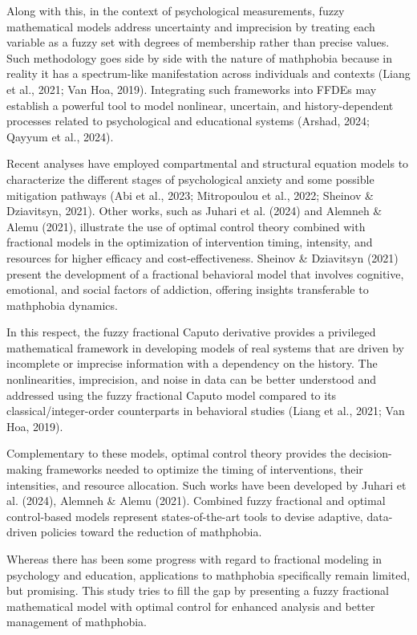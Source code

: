 \documentclass[10pt]{NSP1}
\begin{document}
Along with this, in the context of psychological measurements, fuzzy mathematical models address uncertainty and imprecision by treating each variable as a fuzzy set with degrees of membership rather than precise values. Such methodology goes side by side with the nature of mathphobia because in reality it has a spectrum-like manifestation across individuals and contexts (Liang et al., 2021; Van Hoa, 2019). Integrating such frameworks into FFDEs may establish a powerful tool to model nonlinear, uncertain, and history-dependent processes related to psychological and educational systems (Arshad, 2024; Qayyum et al., 2024).

Recent analyses have employed compartmental and structural equation models to characterize the different stages of psychological anxiety and some possible mitigation pathways (Abi et al., 2023; Mitropoulou et al., 2022; Sheinov \& Dziavitsyn, 2021). Other works, such as Juhari et al. (2024) and Alemneh \& Alemu (2021), illustrate the use of optimal control theory combined with fractional models in the optimization of intervention timing, intensity, and resources for higher efficacy and cost-effectiveness. Sheinov \& Dziavitsyn (2021) present the development of a fractional behavioral model that involves cognitive, emotional, and social factors of addiction, offering insights transferable to mathphobia dynamics.

In this respect, the fuzzy fractional Caputo derivative provides a privileged mathematical framework in developing models of real systems that are driven by incomplete or imprecise information with a dependency on the history. The nonlinearities, imprecision, and noise in data can be better understood and addressed using the fuzzy fractional Caputo model compared to its classical/integer-order counterparts in behavioral studies (Liang et al., 2021; Van Hoa, 2019).

Complementary to these models, optimal control theory provides the decision-making frameworks needed to optimize the timing of interventions, their intensities, and resource allocation. Such works have been developed by Juhari et al. (2024), Alemneh \& Alemu (2021). Combined fuzzy fractional and optimal control-based models represent states-of-the-art tools to devise adaptive, data-driven policies toward the reduction of mathphobia.

Whereas there has been some progress with regard to fractional modeling in psychology and education, applications to mathphobia specifically remain limited, but promising. This study tries to fill the gap by presenting a fuzzy fractional mathematical model with optimal control for enhanced analysis and better management of mathphobia.
\end{document}
